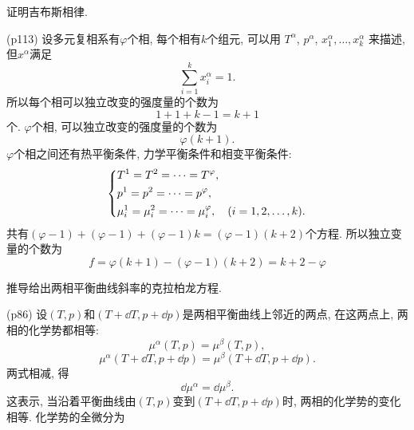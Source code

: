 \begin{questions}
  \question 证明吉布斯相律.
  \begin{solution}
    (p113) 设多元复相系有$\varphi$个相, 每个相有$k$个组元, 可以用 $T^\alpha$, $p^\alpha$, $x_1^\alpha,\dots, x_k^\alpha$ 来描述, 但$x^\alpha$满足
    \begin{equation}
      \sum_{i=1}^{k} x_i^\alpha = 1.
    \end{equation}
    所以每个相可以独立改变的强度量的个数为
    \begin{equation}
      1  + 1 + k - 1 = k+1
    \end{equation}
    个. $\varphi$个相, 可以独立改变的强度量的个数为
    \begin{equation}
      \varphi(k+1).
    \end{equation}
    $\varphi$个相之间还有热平衡条件, 力学平衡条件和相变平衡条件:
    \begin{equation}
      \left\{\begin{aligned}
         & T^1 = T^2 = \cdots = T^\varphi,                                \\
         & p^1 = p^2 = \cdots = p^\varphi,                                \\
         & \mu_i^1 = \mu_i^2 = \cdots = \mu_i^\varphi\qc(i=1,2,\dots, k).
      \end{aligned}\right.
    \end{equation}
    共有$(\varphi-1) + (\varphi-1) + (\varphi-1)k =(\varphi-1)(k+2) $个方程. 所以独立变量的个数为
    \begin{equation}
      f = \varphi(k+1) - (\varphi-1)(k+2) = k+2 - \varphi
    \end{equation}
  \end{solution}
  \question 推导给出两相平衡曲线斜率的克拉柏龙方程.
  \begin{solution}
    (p86) 设$(T, p)$和$(T+\dd T, p+\dd p)$是两相平衡曲线上邻近的两点, 在这两点上, 两相的化学势都相等:
    \begin{equation}
      \mu^\alpha(T,p) = \mu^\beta(T,p),
    \end{equation}
    \begin{equation}
      \mu^\alpha(T+\dd T, p+\dd p) = \mu^\beta(T+\dd T, p+\dd p).
    \end{equation}
    两式相减, 得
    \begin{equation}
      \dd \mu^\alpha = \dd \mu ^\beta.
    \end{equation}
    这表示, 当沿着平衡曲线由$(T, p)$变到$(T+\dd T, p+\dd p)$时, 两相的化学势的变化相等. 化学势的全微分为

\end{solution}
\end{questions}
